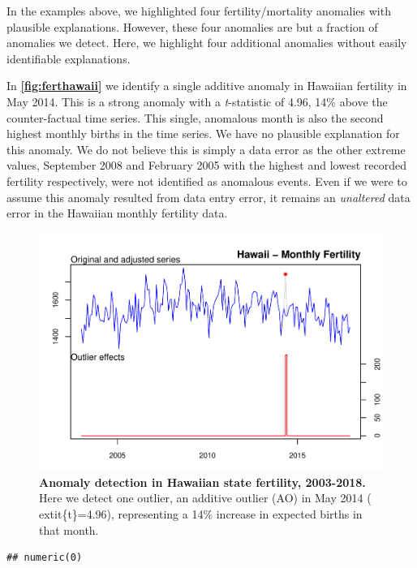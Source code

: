 \documentclass[12pt]{article}
\begin{document}
In the examples above, we highlighted four fertility/mortality anomalies
with plausible explanations. However, these four anomalies are but a
fraction of anomalies we detect. Here, we highlight four additional
anomalies without easily identifiable explanations.

In \textbf{\autoref{fig:ferthawaii}} we identify a single additive
anomaly in Hawaiian fertility in May 2014. This is a strong anomaly with
a \emph{t}-statistic of 4.96, 14\% above the counter-factual time
series. This single, anomalous month is also the second highest monthly
births in the time series. We have no plausible explanation for this
anomaly. We do not believe this is simply a data error as the other
extreme values, September 2008 and February 2005 with the highest and
lowest recorded fertility respectively, were not identified as anomalous
events. Even if we were to assume this anomaly resulted from data entry
error, it remains an \emph{unaltered} data error in the Hawaiian monthly
fertility data.

\begin{figure}
\centering
\includegraphics{manuscript_files/figure-latex/AnomalyHawaii-1.pdf}
\caption{\textbf{Anomaly detection in Hawaiian state fertility, 2003-2018.}
Here we detect one outlier, an additive outlier (AO) in May 2014 (
extit\{t\}=4.96), representing a 14\% increase in expected births in
that month. \label{fig:ferthawaii}}
\end{figure}

\begin{verbatim}
## numeric(0)
\end{verbatim}
\end{document}
